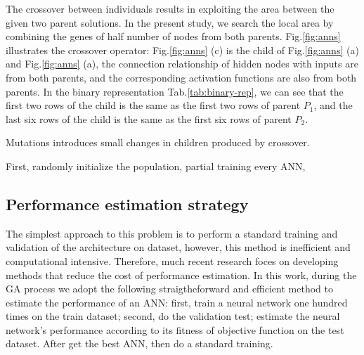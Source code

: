 The crossover between individuals results in exploiting the area between the
given two parent solutions. In the present study, we search the local area by
combining the genes of half number of nodes from both parents.
Fig.\ref{fig:anns} illustrates the crossover operator: Fig.\ref{fig:anns}
(c) is the child of Fig.\ref{fig:anns} (a) and Fig.\ref{fig:anns} (a), the
connection relationship of hidden nodes with inputs are from both parents,  and
the corresponding activation functions are also from both parents. In the
binary representation Tab.\ref{tab:binary-rep}, we can see that the first two
rows of the child is the same as the first two rows of parent $P_1$, and the
last six rows of the child is the same as the first six rows of parent $P_2$.

Mutations introduces small changes in children produced by crossover.

First,  randomly initialize the population, partial training every ANN, 





\subsection{Performance estimation strategy}
The simplest approach to this problem is to perform a standard training and
validation of the architecture on dataset, however, this method is inefficient
and computational intensive. Therefore, much recent
research\cite{baker2017accelerating} foces on developing methods that reduce
the cost of performance estimation. In this work, during the GA process we adopt the following
straigtheforward and efficient method to estimate the performance of an ANN:
first, train a neural network one hundred times on the train dataset;
second, do the validation test; estimate the neural network's performance
according to its fitness of objective function on the test dataset.  After get
the best ANN, then do a standard training.


